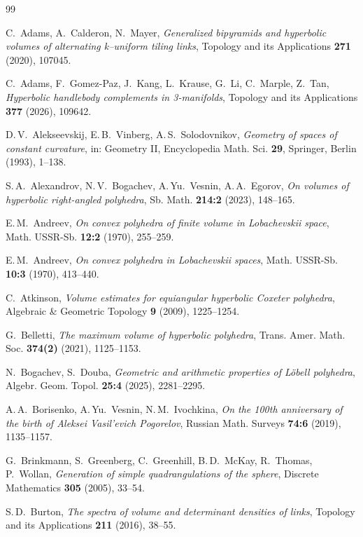\documentclass{amsart}
\begin{document}
\begin{thebibliography}{99}

C.~Adams, A.~Calderon, N.~Mayer, \textit{Generalized bipyramids and hyperbolic volumes of alternating k--uniform tiling links}, Topology and its Applications \textbf{271} (2020), 107045.

C.~Adams, F.~Gomez-Paz, J.~Kang, L.~Krause, G.~Li, C.~Marple, Z.~Tan, \textit{Hyperbolic handlebody complements in 3-manifolds}, Topology and its Applications \textbf{377} (2026), 109642.

D.\,V.~Alekseevskij, E.\,B.~Vinberg, A.\,S.~Solodovnikov, \textit{Geometry of spaces of constant curvature}, in: Geometry II, Encyclopedia Math. Sci. \textbf{29}, Springer, Berlin (1993), 1--138.

S.\,A.~Alexandrov, N.\,V.~Bogachev, A.\,Yu.~Vesnin, A.\,A.~Egorov,
\textit{On volumes of hyperbolic right-angled polyhedra},
Sb. Math. \textbf{214:2} (2023), 148--165.

E.\,M.~Andreev, \textit{On convex polyhedra of finite volume in Lobachevskii space}, Math. USSR-Sb. \textbf{12:2} (1970), 255--259.

E.\,M.~Andreev, \textit{On convex polyhedra in Lobachevskii spaces}, Math. USSR-Sb. \textbf{10:3} (1970), 413--440.

C.~Atkinson, \textit{Volume estimates for equiangular hyperbolic Coxeter polyhedra},
Algebraic \& Geometric Topology \textbf{9} (2009), 1225--1254.

G.~Belletti, \textit{The maximum volume of hyperbolic polyhedra},
Trans. Amer. Math. Soc. \textbf{374(2)} (2021), 1125--1153.

N.~Bogachev, S.~Douba, \textit{Geometric and arithmetic properties of L\"obell polyhedra},
Algebr. Geom. Topol. \textbf{25:4} (2025), 2281--2295.

A.\,A.~Borisenko, A.\,Yu.~Vesnin, N.\,M.~Ivochkina, \textit{On the 100th anniversary of the birth of Aleksei Vasil'evich Pogorelov}, Russian Math. Surveys \textbf{74:6} (2019), 1135--1157.

G.~Brinkmann, S.~Greenberg, C.~Greenhill, B.\,D.~McKay, R.~Thomas, P.~Wollan, \textit{Generation of simple quadrangulations of the sphere}, Discrete Mathematics \textbf{305} (2005), 33--54.

S.\,D.~Burton, \textit{The spectra of volume and determinant densities of links},
Topology and its Applications \textbf{211} (2016), 38--55.


\end{thebibliography}
\end{document}
